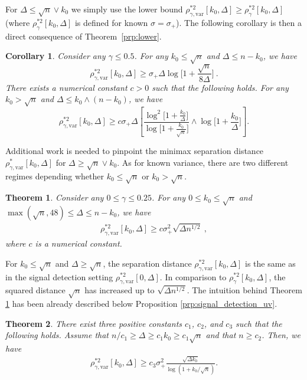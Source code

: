 \documentclass[twoside,11pt]{article}
\newtheorem{thm}{Theorem}
\newtheorem{cor}{Corollary}
\def\beq{\begin{equation}}
\def\eeq{\end{equation}}
\def\beqn{\begin{eqnarray*}}
\def\eeqn{\end{eqnarray*}}
\newcommand{\<}{\langle}
\renewcommand{\>}{\rangle}
\begin{document}
For $\Delta \leq \sqrt{n}\vee k_0$ we simply use the lower bound $\rho_{\gamma,\mathrm{var}}^{*2}[k_0,\Delta]\geq \rho_{\gamma}^{*2}[k_0,\Delta]$ (where $\rho_{\gamma}^{*2}[k_0,\Delta]$ is defined for known $\sigma=\sigma_+$). The following corollary is then a direct consequence of Theorem~\ref{prp:lower}. 
\begin{cor}
Consider any $\gamma\leq 0.5$.  For any  $k_0\leq \sqrt{n}$ and $\Delta\leq n-k_0$, we have
 \beq\label{eq:lower_bound_main_ad}
 \rho_{\gamma,\mathrm{var}}^{*2}[k_0,\Delta] \geq  \sigma_+\Delta \log\Big[1+ \frac{ \sqrt{n}}{8\Delta} \Big]\ .
 \eeq
 There exists a numerical constant $c >0$ such that the following holds. For any $k_0>\sqrt{n}$ and $\Delta\leq k_0\wedge  (n-k_0)$, we have
 \beq\label{eq:lower_bound_main2_ad}
 \rho_{\gamma,\mathrm{var}}^{*2}[k_0,\Delta] \geq c \sigma_+
 \Delta \left[\frac{\log^2\big[1+  \frac{k_0}{\Delta}\big]}{\log\big[1+ \frac{k_0}{\sqrt{n}}\big]}\wedge \log\big[1+ \frac{k_0}{\Delta}\big] \right].
\eeq
\end{cor}


Additional work is needed to pinpoint the minimax separation distance $\rho_{\gamma,\mathrm{var}}^{*}[k_0,\Delta]$ for $\Delta \geq \sqrt{n}\vee k_0$. As for known variance, there are two different regimes  depending whether $k_0\leq \sqrt{n}$ or $k_0> \sqrt{n}$. 
\begin{thm}\label{thm:lower_bound_mainuv}
Consider any $0\leq \gamma\leq 0.25$. For any  $0\leq k_0 \leq \sqrt{n}$ and $\max(\sqrt{n}, 48) \leq \Delta\leq n-k_0$, we have 
 \beqn
 \rho_{\gamma,\mathrm{var}}^{*2}[k_0,\Delta] \geq c\sigma_+^2 \sqrt{\Delta n^{1/2}}\ ,
 \eeqn
 where $c$ is a numerical constant.
\end{thm}
For $k_0\leq \sqrt{n}$ and $\Delta\geq \sqrt{n}$, the separation distance $\rho_{\gamma,\mathrm{var}}^{*2}[k_0,\Delta]$ is the same as in the signal detection setting $\rho_{\gamma,\mathrm{var}}^{*2}[0,\Delta]$. In comparison to $\rho_{\gamma}^{*2}[k_0,\Delta]$, the squared distance $\sqrt{n}$ has increased up to $\sqrt{\Delta n^{1/2}}$. The intuition behind Theorem \ref{thm:lower_bound_mainuv} has been already described below Proposition \ref{prp:signal_detection_uv}.

\begin{thm}\label{thm:lower_bound_mainuv2} There exist three positive constants $c_1$, $c_2$, and $c_3$ such that the following holds. 
Assume that $n/c_1 \geq \Delta \geq c_1 k_0 \geq c_1\sqrt{n}$ and that $n\geq c_2$. Then, we have 
 \beqn
 \rho_{\gamma,\mathrm{var}}^{*2}[k_0,\Delta] \geq c_{3} \sigma^2_+ \frac{\sqrt{\Delta k_0}}{\log(1 + k_0/\sqrt{n})}.
 \eeqn
\end{thm}
\end{document}
